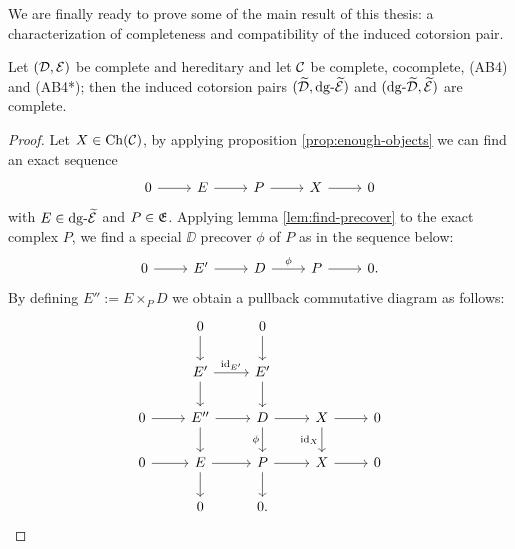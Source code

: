 We are finally ready to prove some of the main result of this thesis: a characterization of completeness and compatibility of the induced cotorsion pair.



\begin{theorem}
    Let $(\mathcal{D}, \mathcal{E})$ be complete and hereditary and let $\mathcal{C}$ be complete, cocomplete, (AB4) and (AB4*); then the induced cotorsion pairs $(\widetilde{\mathcal{D}}, \mathrm{dg} \text{-}\widetilde{\mathcal{E}})$ and $(\mathrm{dg} \text{-}\widetilde{\mathcal{D}}, \widetilde{\mathcal{E}})$ are complete. 
\end{theorem}

\begin{proof}
    Let $X \in \mathrm{Ch}(\mathcal{C})$, by applying proposition \ref{prop:enough-objects} we can find an exact sequence
    \[\begin{tikzcd}
        0 & E & P & X & 0
        \arrow[from=1-1, to=1-2]
        \arrow[from=1-2, to=1-3]
        \arrow[from=1-3, to=1-4]
        \arrow[from=1-4, to=1-5]
    \end{tikzcd}\]
    with $E \in \mathrm{dg} \text{-}\widetilde{\mathcal{E}}$ and $P \in \mathfrak{E}$. Applying lemma \ref{lem:find-precover} to the exact complex $P$, we find a special $\DD$ precover $\phi$ of $P$ as in the sequence below:
    \[\begin{tikzcd}
        0 & {E'} & D & P & {0.}
        \arrow[from=1-1, to=1-2]
        \arrow[from=1-2, to=1-3]
        \arrow["\phi", from=1-3, to=1-4]
        \arrow[from=1-4, to=1-5]
    \end{tikzcd}\]
    By defining $E'':= E \times_P D$ we obtain a pullback commutative diagram as follows:
    \[\begin{tikzcd}
        & 0 & 0 && \\
        & {E'} & {E'} \\
        0 & {E''} & D & X & 0 \\
        0 & E & P & X & 0 \\
        & 0 & {0.}
        \arrow[from=1-2, to=2-2]
        \arrow[from=1-3, to=2-3]
        \arrow["{\id_{E'}}", from=2-2, to=2-3]
        \arrow[from=2-2, to=3-2]
        \arrow[from=2-3, to=3-3]
        \arrow[from=3-1, to=3-2]
        \arrow[from=3-2, to=3-3]
        \arrow[from=3-2, to=4-2]
        \arrow[from=3-3, to=3-4]
        \arrow["\phi"', from=3-3, to=4-3]
        \arrow[from=3-4, to=3-5]
        \arrow["{\id_X}"', from=3-4, to=4-4]
        \arrow[from=4-1, to=4-2]
        \arrow[from=4-2, to=4-3]
        \arrow[from=4-2, to=5-2]
        \arrow[from=4-3, to=4-4]
        \arrow[from=4-3, to=5-3]
        \arrow[from=4-4, to=4-5]
    \end{tikzcd}\]

\end{proof}
